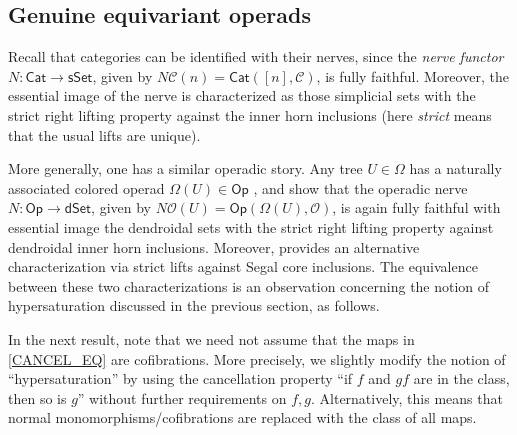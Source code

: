 \documentclass[a4paper,10pt
 ,draft
]{article}%
\begin{document}
\subsection{Genuine equivariant operads}\label{GENEQOP SEC}


Recall that categories can be identified with their nerves, since the \textit{nerve functor}
$N \colon \mathsf{Cat} \to \mathsf{sSet}$, 
given by $N\mathcal C (n) = \mathsf{Cat}([n], \mathcal C)$, 
is fully faithful.
Moreover, the essential image of the nerve is characterized as those simplicial sets
with the strict right lifting property 
against the inner horn inclusions \cite[Prop. 1.1.2.2]{Lur09}
(here \textit{strict} means that the usual lifts are unique).

More generally, 
one has a similar operadic story. Any tree $U \in \Omega$ has a naturally associated colored operad 
$\Omega(U) \in \mathsf{Op}$ \cite[\S 3]{MW07}, and
\cite[Prop. 5.3 and Thm. 6.1]{MW09} show that the operadic nerve
$N \colon \mathsf{Op} \to \mathsf{dSet}$, 
given by $N\mathcal{O} (U) = \mathsf{Op}(\Omega(U), \mathcal {O})$,
is again fully faithful
with essential image the dendroidal sets with the strict right lifting property against dendroidal inner horn inclusions.
Moreover, \cite[Cor. 2.6]{CM13a} provides an alternative characterization via strict lifts against Segal core inclusions. The equivalence between these two characterizations is an observation concerning the notion of hypersaturation discussed in the previous section, as follows.


In the next result, note that we need not assume that the maps in
\eqref{CANCEL_EQ} are cofibrations. More precisely,
we slightly modify the notion of ``hypersaturation'' by using the cancellation property 
``if $f$ and $gf$ are in the class, then so is $g$'' without further  requirements on $f,g$. Alternatively, this means that normal monomorphisms/cofibrations are replaced with the class of all maps.
\end{document}
